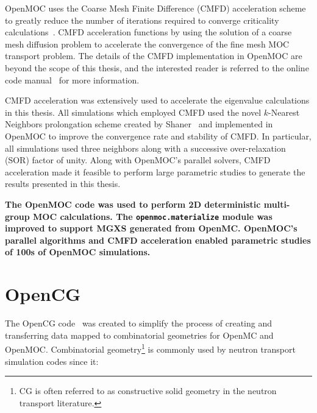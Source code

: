 OpenMOC uses the Coarse Mesh Finite Difference (CMFD) acceleration scheme to greatly reduce the number of iterations required to converge criticality calculations~\cite{boyd2014openmoc}. \ac{CMFD} acceleration functions by using the solution of a coarse mesh diffusion problem to accelerate the convergence of the fine mesh \ac{MOC} transport problem. The details of the \ac{CMFD} implementation in OpenMOC are beyond the scope of this thesis, and the interested reader is referred to the online code manual~\cite{openmoc2016manual} for more information. 

\ac{CMFD} acceleration was extensively used to accelerate the eigenvalue calculations in this thesis. All simulations which employed \ac{CMFD} used the novel $k$-Nearest Neighbors prolongation scheme created by Shaner~\cite{shaner2015cmfd} and implemented in OpenMOC to improve the convergence rate and stability of \ac{CMFD}. In particular, all simulations used three neighbors along with a successive over-relaxation (SOR) factor of unity. Along with OpenMOC's parallel solvers, \ac{CMFD} acceleration made it feasible to perform large parametric studies to generate the results presented in this thesis.


\begin{emphbox}
\textbf{The OpenMOC code was used to perform 2D deterministic multi-group \ac{MOC} calculations. The \texttt{openmoc.materialize} module was improved to support \ac{MGXS} generated from OpenMC. OpenMOC's parallel algorithms and \ac{CMFD} acceleration enabled parametric studies of 100s of OpenMOC simulations.}
\end{emphbox}


\section{OpenCG}
\label{sec:chap4-opencg}

The OpenCG code~\cite{boyd2015opencg} was created to simplify the process of creating and transferring data mapped to combinatorial geometries for OpenMC and OpenMOC. Combinatorial geometry\footnote{\ac{CG} is often referred to as constructive solid geometry in the neutron transport literature.} is commonly used by neutron transport simulation codes since it:

